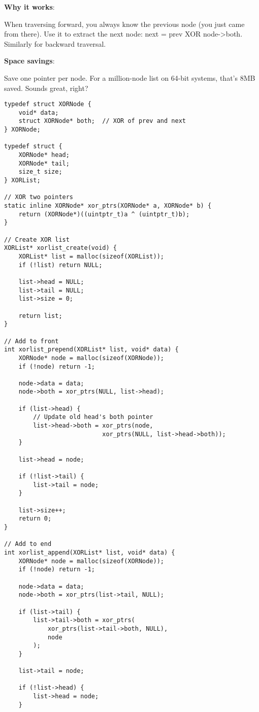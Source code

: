 \textbf{Why it works}:

When traversing forward, you always know the previous node (you just came from there). Use it to extract the next node: next = prev XOR node->both. Similarly for backward traversal.

\textbf{Space savings}:

Save one pointer per node. For a million-node list on 64-bit systems, that's 8MB saved. Sounds great, right?

\begin{lstlisting}
typedef struct XORNode {
    void* data;
    struct XORNode* both;  // XOR of prev and next
} XORNode;

typedef struct {
    XORNode* head;
    XORNode* tail;
    size_t size;
} XORList;

// XOR two pointers
static inline XORNode* xor_ptrs(XORNode* a, XORNode* b) {
    return (XORNode*)((uintptr_t)a ^ (uintptr_t)b);
}

// Create XOR list
XORList* xorlist_create(void) {
    XORList* list = malloc(sizeof(XORList));
    if (!list) return NULL;

    list->head = NULL;
    list->tail = NULL;
    list->size = 0;

    return list;
}

// Add to front
int xorlist_prepend(XORList* list, void* data) {
    XORNode* node = malloc(sizeof(XORNode));
    if (!node) return -1;

    node->data = data;
    node->both = xor_ptrs(NULL, list->head);

    if (list->head) {
        // Update old head's both pointer
        list->head->both = xor_ptrs(node,
                           xor_ptrs(NULL, list->head->both));
    }

    list->head = node;

    if (!list->tail) {
        list->tail = node;
    }

    list->size++;
    return 0;
}

// Add to end
int xorlist_append(XORList* list, void* data) {
    XORNode* node = malloc(sizeof(XORNode));
    if (!node) return -1;

    node->data = data;
    node->both = xor_ptrs(list->tail, NULL);

    if (list->tail) {
        list->tail->both = xor_ptrs(
            xor_ptrs(list->tail->both, NULL),
            node
        );
    }

    list->tail = node;

    if (!list->head) {
        list->head = node;
    }


\end{lstlisting}
